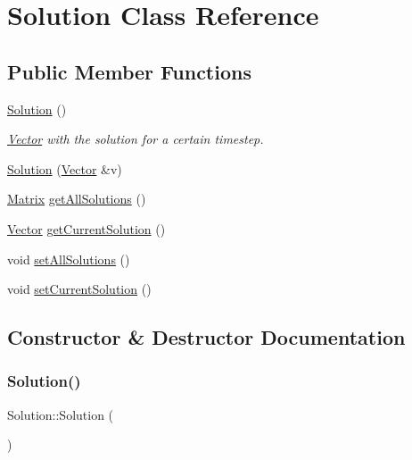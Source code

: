 \hypertarget{class_solution}{}\section{Solution Class Reference}
\label{class_solution}
\subsection*{Public Member Functions}
\begin{DoxyCompactItemize}
\item 
\hyperlink{class_solution_ab55bd4b023d596ce11aaf737b9a6123b}{Solution} ()
\begin{DoxyCompactList}\small\item\em \hyperlink{class_vector}{Vector} with the solution for a certain timestep. \end{DoxyCompactList}\item 
\hyperlink{class_solution_ad2732696d61865b9ec2f4ce9bd00c607}{Solution} (\hyperlink{class_vector}{Vector} \&v)
\item 
\hyperlink{class_matrix}{Matrix} \hyperlink{class_solution_a6e44ed377115a0f5168eab5e844009bc}{get\+All\+Solutions} ()
\item 
\hyperlink{class_vector}{Vector} \hyperlink{class_solution_a62dfee911f620d7b4caf29e0e891c25e}{get\+Current\+Solution} ()
\item 
void \hyperlink{class_solution_a820fbf0f27410781d4f9ed8151d65c67}{set\+All\+Solutions} ()
\item 
void \hyperlink{class_solution_a5a822dac7b42e37e4a8ddd686a00c26f}{set\+Current\+Solution} ()
\end{DoxyCompactItemize}


\subsection{Constructor \& Destructor Documentation}
\mbox{\label{class_solution_ab55bd4b023d596ce11aaf737b9a6123b}} 
\subsubsection{\texorpdfstring{Solution()}{Solution()}\hspace{0.1cm}{\footnotesize\ttfamily [1/2]}}
{\footnotesize\ttfamily Solution\+::\+Solution (\begin{DoxyParamCaption}{ }\end{DoxyParamCaption})}



